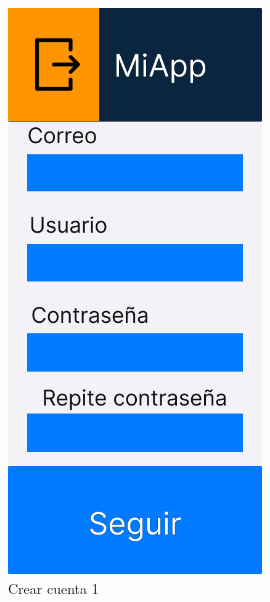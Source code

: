 \begin{figure}[H]
   \centering
    \includegraphics[width=0.6\textwidth]{fotos/Frame 24.png}
    \caption{Crear cuenta 1}
    \label{fig:Crear cuenta 1}
\end{figure}
